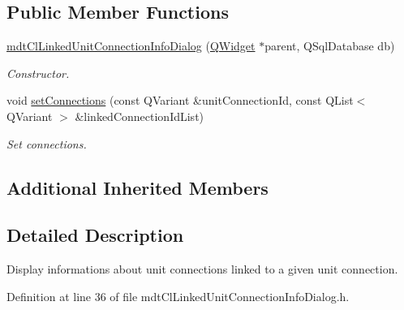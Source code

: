 \subsection*{Public Member Functions}
\begin{DoxyCompactItemize}
\item 
\hyperlink{classmdt_cl_linked_unit_connection_info_dialog_a435b36e611f1aecefe3b9fb8f33d77bc}{mdt\-Cl\-Linked\-Unit\-Connection\-Info\-Dialog} (\hyperlink{class_q_widget}{Q\-Widget} $\ast$parent, Q\-Sql\-Database db)
\begin{DoxyCompactList}\small\item\em Constructor. \end{DoxyCompactList}\item 
void \hyperlink{classmdt_cl_linked_unit_connection_info_dialog_a0174bb7aa7a5c1d3affc965df9d21cba}{set\-Connections} (const Q\-Variant \&unit\-Connection\-Id, const Q\-List$<$ Q\-Variant $>$ \&linked\-Connection\-Id\-List)
\begin{DoxyCompactList}\small\item\em Set connections. \end{DoxyCompactList}\end{DoxyCompactItemize}
\subsection*{Additional Inherited Members}


\subsection{Detailed Description}
Display informations about unit connections linked to a given unit connection. 

Definition at line 36 of file mdt\-Cl\-Linked\-Unit\-Connection\-Info\-Dialog.\-h.



